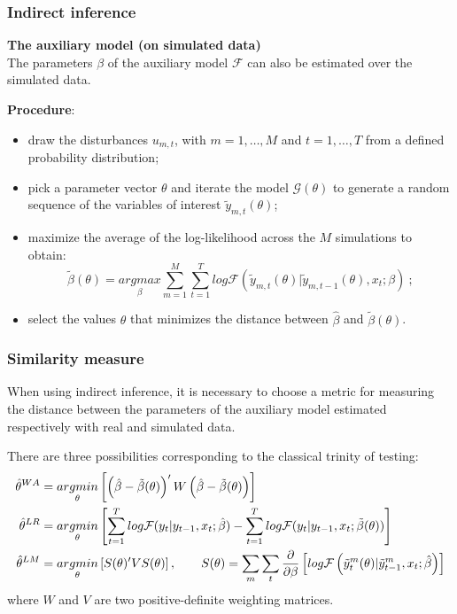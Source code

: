 \documentclass[10pt]{beamer}
\begin{document}
\begin{frame}[c]\frametitle{Indirect inference}
    \textbf{The auxiliary model (on simulated data)}
    \\ The parameters $\beta$ of the auxiliary model $\mathcal{F}$ can also be estimated over the simulated data. \bigskip

    \textbf{Procedure}:
    \begin{itemize}
    	\item draw the disturbances $u_{m,t}$, with $m = 1, \dots, M$ and $t = 1, \dots, T$ from a defined probability distribution;
    	\item pick a parameter vector $\theta$ and iterate the model $\mathcal{G}(\theta)$ to generate a random sequence of the variables of interest $\tilde{y}_{m,t}(\theta)$;
    	\item maximize the average of the log-likelihood across the $M$ simulations to obtain:
    	\begin{equation}
    		\tilde{\beta}(\theta) = \underset{\beta}{argmax} \sum_{m=1}^{M} \sum_{t=1}^{T} log \mathcal{F}(\tilde{y}_{m,t}(\theta) | \tilde{y}_{m,t-1}(\theta), x_{t}; \beta)~;
    	\end{equation}
    	\item select the values $\theta$ that minimizes the distance between $\hat{\beta}$ and $\tilde{\beta}(\theta)$.
    \end{itemize}
\end{frame}


\begin{frame}[c]\frametitle{Similarity measure}
    When using indirect inference, it is necessary to choose a metric for measuring the distance between the parameters of the auxiliary model estimated respectively with real and simulated data. \bigskip

    {}
    There are three possibilities corresponding to the classical trinity of testing: 
	\begin{align*}
		\hat{\theta}^{WA} & = \underset{\theta}{argmin} \left[ \left(\hat{\beta} - \tilde{\beta}(\theta)\right)' W \left(\hat{\beta} - \tilde{\beta}(\theta) \right) \right] \\ \vspace{.2cm}
		\hat{\theta}^{LR} & = \underset{\theta}{argmin} \left[ \sum_{t=1}^{T} log \mathcal{F}(y_{t} | y_{t-1}, x_{t}; \hat{\beta}) -  \sum_{t=1}^{T} log \mathcal{F}(y_{t} | y_{t-1}, x_{t}; \tilde{\beta}(\theta))\right] \\ \vspace{.2cm}
		\hat{\theta}^{LM} & = \underset{\theta}{argmin} \left[ S(\theta)' V S(\theta) \right], \qquad S(\theta) = \sum_m \sum_t \frac{\partial}{\partial \beta} \left[ log \mathcal{F} \left( \tilde{y}_{t}^{m} (\theta) | \tilde{y}_{t-1}^{m}, x_{t}; \hat{\beta} \right) \right]
	\end{align*}
	where $W$ and $V$ are two positive-definite weighting matrices.
\end{frame}
\end{document}
